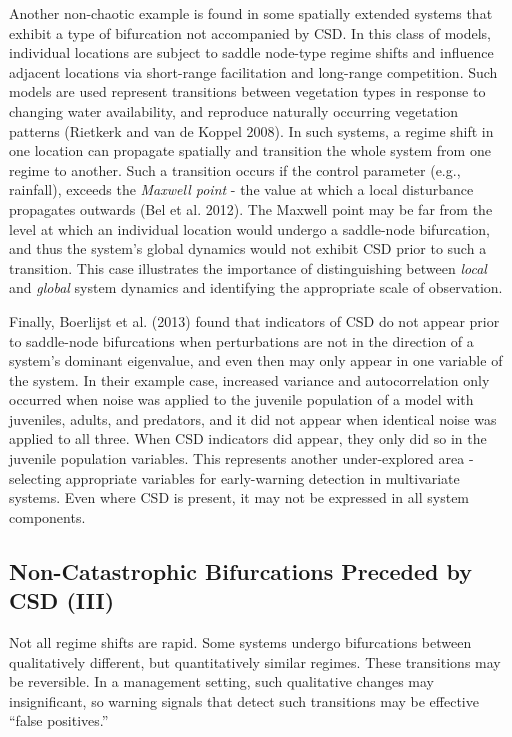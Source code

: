 \documentclass{article}
\begin{document}
Another non-chaotic example is found in some spatially extended systems
that exhibit a type of bifurcation not accompanied by CSD. In this class
of models, individual locations are subject to saddle node-type regime
shifts and influence adjacent locations via short-range facilitation and
long-range competition. Such models are used represent transitions
between vegetation types in response to changing water availability, and
reproduce naturally occurring vegetation patterns (Rietkerk and van de
Koppel 2008). In such systems, a regime shift in one location can
propagate spatially and transition the whole system from one regime to
another. Such a transition occurs if the control parameter (e.g.,
rainfall), exceeds the \emph{Maxwell point} - the value at which a local
disturbance propagates outwards (Bel et al. 2012). The Maxwell point may
be far from the level at which an individual location would undergo a
saddle-node bifurcation, and thus the system's global dynamics would not
exhibit CSD prior to such a transition. This case illustrates the
importance of distinguishing between \emph{local} and \emph{global}
system dynamics and identifying the appropriate scale of observation.

Finally, Boerlijst et al. (2013) found that indicators of CSD do not
appear prior to saddle-node bifurcations when perturbations are not in
the direction of a system's dominant eigenvalue, and even then may only
appear in one variable of the system. In their example case, increased
variance and autocorrelation only occurred when noise was applied to the
juvenile population of a model with juveniles, adults, and predators,
and it did not appear when identical noise was applied to all three.
When CSD indicators did appear, they only did so in the juvenile
population variables. This represents another under-explored area -
selecting appropriate variables for early-warning detection in
multivariate systems. Even where CSD is present, it may not be expressed
in all system components.

\subsection{Non-Catastrophic Bifurcations Preceded by CSD (III)}

Not all regime shifts are rapid. Some systems undergo bifurcations
between qualitatively different, but quantitatively similar regimes.
These transitions may be reversible. In a management setting, such
qualitative changes may insignificant, so warning signals that detect
such transitions may be effective ``false positives.''
\end{document}
